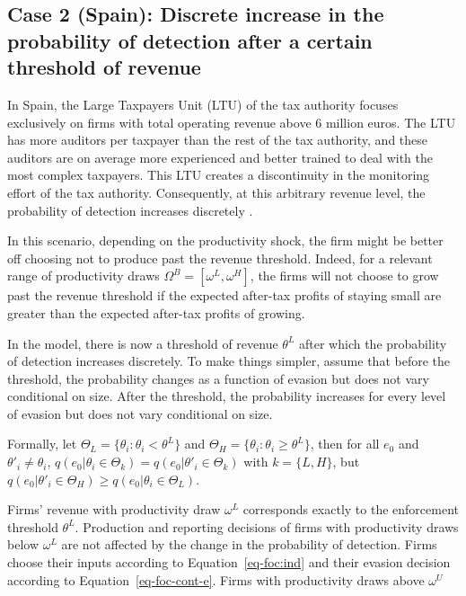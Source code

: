 \documentclass[
  12pt]{article}
\begin{document}
\hypertarget{case-2-spain-discrete-increase-in-the-probability-of-detection-after-a-certain-threshold-of-revenue}{%
\subsection{Case 2 (Spain): Discrete increase in the probability of
detection after a certain threshold of
revenue}\label{case-2-spain-discrete-increase-in-the-probability-of-detection-after-a-certain-threshold-of-revenue}}

In Spain, the Large Taxpayers Unit (LTU) of the tax authority focuses
exclusively on firms with total operating revenue above 6 million euros.
The LTU has more auditors per taxpayer than the rest of the tax
authority, and these auditors are on average more experienced and better
trained to deal with the most complex taxpayers. This LTU creates a
discontinuity in the monitoring effort of the tax authority.
Consequently, at this arbitrary revenue level, the probability of
detection increases discretely \citep{Almunia2018}.

In this scenario, depending on the productivity shock, the firm might be
better off choosing not to produce past the revenue threshold. Indeed,
for a relevant range of productivity draws
\(\Omega^B=[\omega^L, \omega^H]\), the firms will not choose to grow
past the revenue threshold if the expected after-tax profits of staying
small are greater than the expected after-tax profits of growing.

In the model, there is now a threshold of revenue \(\theta^L\) after
which the probability of detection increases discretely. To make things
simpler, assume that before the threshold, the probability changes as a
function of evasion but does not vary conditional on size. After the
threshold, the probability increases for every level of evasion but does
not vary conditional on size.

Formally, let \(\Theta_{L} = \{\theta_i : \theta_{i} < \theta^L \}\) and
\(\Theta_{H} = \{\theta_i : \theta_{i} \ge \theta^L \}\), then for all
\(e_0\) and \(\theta'_i\not=\theta_i\),
\(q(e_0|\theta_i \in \Theta_k)=q(e_0|\theta'_i \in \Theta_k)\) with
\(k=\{L,H\}\), but
\(q(e_0|\theta'_i \in \Theta_H)\ge q(e_0|\theta_i \in \Theta_L)\).

Firms' revenue with productivity draw \(\omega^L\) corresponds exactly
to the enforcement threshold \(\theta^L\). Production and reporting
decisions of firms with productivity draws below \(\omega^L\) are not
affected by the change in the probability of detection. Firms choose
their inputs according to Equation~\ref{eq-foc:ind} and their evasion
decision according to Equation~\ref{eq-foc-cont-e}. Firms with
productivity draws above \(\omega^U\)
\end{document}
